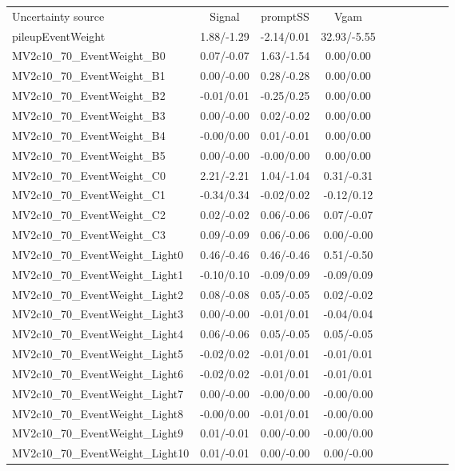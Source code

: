 \begin{table}[h]
\scriptsize
\begin{center}
\begin{tabular}{l|ccccccccc}
\hline
\hline
Uncertainty source &Signal &promptSS &Vgam \\
pileupEventWeight &1.88/-1.29 &-2.14/0.01 &32.93/-5.55 \\
MV2c10\_70\_EventWeight\_B0 &0.07/-0.07 &1.63/-1.54 &0.00/0.00 \\
MV2c10\_70\_EventWeight\_B1 &0.00/-0.00 &0.28/-0.28 &0.00/0.00 \\
MV2c10\_70\_EventWeight\_B2 &-0.01/0.01 &-0.25/0.25 &0.00/0.00 \\
MV2c10\_70\_EventWeight\_B3 &0.00/-0.00 &0.02/-0.02 &0.00/0.00 \\
MV2c10\_70\_EventWeight\_B4 &-0.00/0.00 &0.01/-0.01 &0.00/0.00 \\
MV2c10\_70\_EventWeight\_B5 &0.00/-0.00 &-0.00/0.00 &0.00/0.00 \\
MV2c10\_70\_EventWeight\_C0 &2.21/-2.21 &1.04/-1.04 &0.31/-0.31 \\
MV2c10\_70\_EventWeight\_C1 &-0.34/0.34 &-0.02/0.02 &-0.12/0.12 \\
MV2c10\_70\_EventWeight\_C2 &0.02/-0.02 &0.06/-0.06 &0.07/-0.07 \\
MV2c10\_70\_EventWeight\_C3 &0.09/-0.09 &0.06/-0.06 &0.00/-0.00 \\
MV2c10\_70\_EventWeight\_Light0 &0.46/-0.46 &0.46/-0.46 &0.51/-0.50 \\
MV2c10\_70\_EventWeight\_Light1 &-0.10/0.10 &-0.09/0.09 &-0.09/0.09 \\
MV2c10\_70\_EventWeight\_Light2 &0.08/-0.08 &0.05/-0.05 &0.02/-0.02 \\
MV2c10\_70\_EventWeight\_Light3 &0.00/-0.00 &-0.01/0.01 &-0.04/0.04 \\
MV2c10\_70\_EventWeight\_Light4 &0.06/-0.06 &0.05/-0.05 &0.05/-0.05 \\
MV2c10\_70\_EventWeight\_Light5 &-0.02/0.02 &-0.01/0.01 &-0.01/0.01 \\
MV2c10\_70\_EventWeight\_Light6 &-0.02/0.02 &-0.01/0.01 &-0.01/0.01 \\
MV2c10\_70\_EventWeight\_Light7 &0.00/-0.00 &-0.00/0.00 &-0.00/0.00 \\
MV2c10\_70\_EventWeight\_Light8 &-0.00/0.00 &-0.01/0.01 &-0.00/0.00 \\
MV2c10\_70\_EventWeight\_Light9 &0.01/-0.01 &0.00/-0.00 &-0.00/0.00 \\
MV2c10\_70\_EventWeight\_Light10 &0.01/-0.01 &0.00/-0.00 &0.00/-0.00 \\

\end{tabular}
\end{center}
\end{table}
